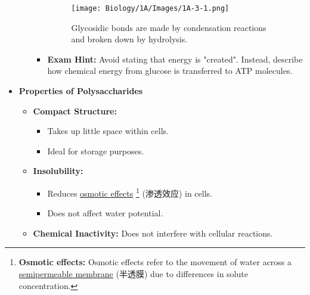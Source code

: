 \begin{itemize}
\begin{itemize}
\begin{itemize}
\begin{figure}[H]
                \centering
                \texttt{[image: Biology/1A/Images/1A-3-1.png]}
                \caption{Glycosidic bonds are made by condensation reactions and broken down by hydrolysis.}
            \end{figure}
            \item \textbf{Exam Hint:} Avoid stating that energy is "created". Instead, describe how chemical energy from glucose
            is transferred to ATP molecules.
        \end{itemize}
    \end{itemize}
    \item \textbf{Properties of Polysaccharides}
    \begin{itemize}
        \item[1.] \textbf{Compact Structure:}
        \begin{itemize}
            \item Takes up little space within cells.
            \item Ideal for storage purposes.
        \end{itemize}
        \item[2.] \textbf{Insolubility:}
        \begin{itemize}
            \item Reduces \underline{osmotic effects} \footnote{\textbf{Osmotic effects:} Osmotic effects refer to the movement
            of water across a \underline{semipermeable membrane} \footnotemark[10] (半透膜) due to differences in solute
            concentration.} (渗透效应) in cells.
            \item Does not affect water potential.
        \end{itemize} 
        \item[3.] \textbf{Chemical Inactivity:} Does not interfere with cellular reactions.
    \end{itemize}
\end{itemize}
